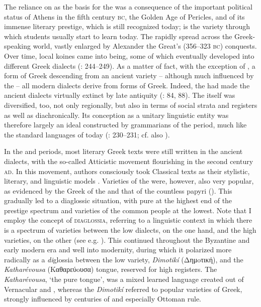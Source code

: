 The reliance on  as the basis for the  was a consequence of the important political status of Athens in the fifth century \textsc{bc}, the Golden Age of Pericles, and of its immense literary prestige, which is still recognized today;  is the variety through which students usually start to learn  today. The  rapidly spread across the Greek-speaking world, vastly enlarged by Alexander the Great’s (356–323 \textsc{bc}) conquests. Over time, local koines came into being, some of which eventually developed into different  Greek dialects (\citealt{Brixhe2010}: 244–249). As a matter of fact, with the exception of , a form of Greek descending from an ancient   variety – although much influenced by the  \citep[88]{Horrocks2010} – all modern dialects derive from forms of  Greek. Indeed, the  had made the ancient dialects virtually extinct by late antiquity (\citealt{Horrocks2010}: 84, 88). The  itself was diversified, too, not only regionally, but also in terms of social strata and registers as well as diachronically. Its conception as a unitary linguistic entity was therefore largely an ideal constructed by grammarians of the period, much like the standard languages of today (\citealt{Brixhe2010}: 230–231; cf. also \citealt{VanRooy2016b}).

In the  and  periods, most literary Greek texts were still written in the ancient dialects, with the so-called Atticistic movement flourishing in the second century \textsc{ad}. In this movement, authors consciously took Classical  texts as their stylistic, literary, and linguistic models \citep[42]{Whitmarsh2005}. Varieties of the  were, however, also very popular, as evidenced by the Greek of the  and that of the countless  papyri (\citealt{Evans2010}). This gradually led to a diaglossic situation, with pure  at the highest end of the prestige spectrum and  varieties of the common people at the lowest. Note that I employ the concept of \textsc{diaglossia}, referring to a linguistic context in which there is a spectrum of varieties between the low  dialects, on the one hand, and the high varieties, on the other (see e.g. \citealt{Auer2005,Rutten2016}). This  continued throughout the Byzantine and early modern era and well into modernity, during which it polarized more radically as a \textit{di}glossia between the low  variety, \textit{Dimotikí} (Δημoτική), and the \textit{Katharévousa} (Kαθαρεύoυσα) tongue, reserved for high registers. The \textit{Katharévousa}, ‘the pure tongue’, was a mixed learned language created out of Vernacular and , whereas the \textit{Dimotikí} referred to popular varieties of Greek, strongly influenced by centuries of  and especially Ottoman rule.

